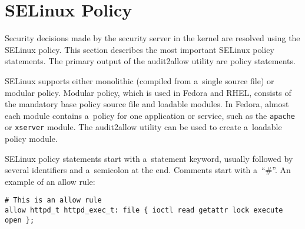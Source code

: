 \section{SELinux Policy}
\label{policy}
Security decisions made by the security server in the kernel are resolved using
the SELinux policy. This section describes the most important SELinux policy
statements. The primary output of the audit2allow utility are policy statements.

SELinux supports either monolithic (compiled from a~single source file) or
modular policy. Modular policy, which is used in Fedora and RHEL, consists of
the mandatory base policy source file and loadable modules. In Fedora, almost
each module contains a~policy for one application or service, such as the
\texttt{apache} or \texttt{xserver} module. The audit2allow utility can be used
to create a~loadable policy module.

SELinux policy statements start with a~statement keyword, usually followed by
several identifiers and a~semicolon at the end. Comments start with a~``\#''.
An example of an allow rule:
\begin{lstlisting}[language=te]
# This is an allow rule
allow httpd_t httpd_exec_t: file { ioctl read getattr lock execute open };
\end{lstlisting}

